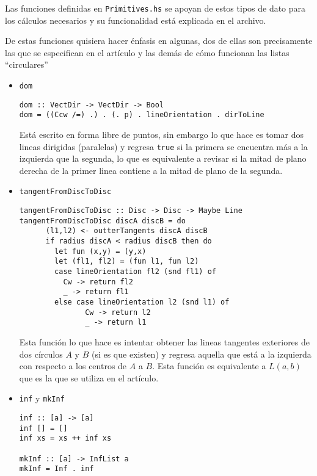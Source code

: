 \documentclass[12pt]{article}
\begin{document}
Las funciones definidas en \texttt{Primitives.hs} se apoyan de estos tipos de dato para los cálculos necesarios y su funcionalidad está explicada en el archivo.

De estas funciones quisiera hacer énfasis en algunas, dos de ellas son precisamente las que se especifican en el artículo y las demás de cómo funcionan las listas ``circulares''

\begin{itemize}
\item \texttt{dom}

  \begin{verbatim}
dom :: VectDir -> VectDir -> Bool
dom = ((Ccw /=) .) . (. p) . lineOrientation . dirToLine
  \end{verbatim}

  Está escrito en forma libre de puntos, sin embargo lo que hace es tomar dos lineas dirigidas (paralelas) y regresa \texttt{true} si la primera se encuentra más a la izquierda que la segunda, lo que es equivalente a revisar si la mitad de plano derecha de la primer linea contiene a la mitad de plano de la segunda.

\item \texttt{tangentFromDiscToDisc}

  \begin{verbatim}
tangentFromDiscToDisc :: Disc -> Disc -> Maybe Line
tangentFromDiscToDisc discA discB = do
      (l1,l2) <- outterTangents discA discB
      if radius discA < radius discB then do
        let fun (x,y) = (y,x)
        let (fl1, fl2) = (fun l1, fun l2)
        case lineOrientation fl2 (snd fl1) of
          Cw -> return fl2
          _ -> return fl1
        else case lineOrientation l2 (snd l1) of
               Cw -> return l2
               _ -> return l1
  \end{verbatim}

  Esta función lo que hace es intentar obtener las lineas tangentes exteriores de dos círculos $A$ y $B$ (si es que existen) y regresa aquella que está a la izquierda con respecto a los centros de $A$ a $B$. Esta función es equivalente a $L(a,b)$ que es la que se utiliza en el artículo.

\item \texttt{inf} y \texttt{mkInf}

  \begin{verbatim}
inf :: [a] -> [a]
inf [] = []
inf xs = xs ++ inf xs

mkInf :: [a] -> InfList a
mkInf = Inf . inf    
  \end{verbatim}


\end{itemize}
\end{document}
